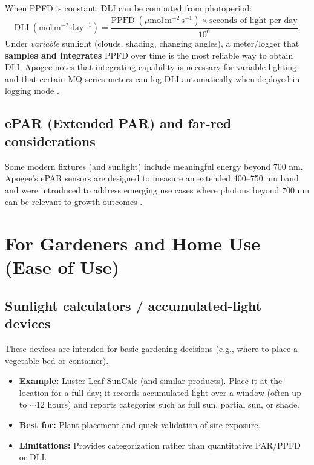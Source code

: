 \documentclass[11pt]{article}
\begin{document}
When PPFD is constant, DLI can be computed from photoperiod:
\[
\mathrm{DLI}\;(\mathrm{mol}\,\mathrm{m}^{-2}\,\mathrm{day}^{-1}) =
\frac{\mathrm{PPFD}\;(\mu\mathrm{mol}\,\mathrm{m}^{-2}\,\mathrm{s}^{-1}) \times \text{seconds of light per day}}{10^{6}}.
\]
Under \emph{variable} sunlight (clouds, shading, changing angles), a meter/logger that \textbf{samples and integrates} PPFD over time is the most reliable way to obtain DLI. Apogee notes that integrating capability is necessary for variable lighting and that certain MQ-series meters can log DLI automatically when deployed in logging mode \cite{apogee_dli_measuring,apogee_mq500_pdf}.

\subsection{ePAR (Extended PAR) and far-red considerations}
Some modern fixtures (and sunlight) include meaningful energy beyond 700 nm. Apogee's ePAR sensors are designed to measure an extended 400--750 nm band and were introduced to address emerging use cases where photons beyond 700 nm can be relevant to growth outcomes \cite{apogee_pq612}.

\section{For Gardeners and Home Use (Ease of Use)}
\subsection{Sunlight calculators / accumulated-light devices}
These devices are intended for basic gardening decisions (e.g., where to place a vegetable bed or container).
\begin{itemize}
  \item \textbf{Example:} Luster Leaf SunCalc (and similar products). Place it at the location for a full day; it records accumulated light over a window (often up to \(\sim\)12 hours) and reports categories such as full sun, partial sun, or shade.
  \item \textbf{Best for:} Plant placement and quick validation of site exposure.
  \item \textbf{Limitations:} Provides categorization rather than quantitative PAR/PPFD or DLI.
\end{itemize}
\end{document}
